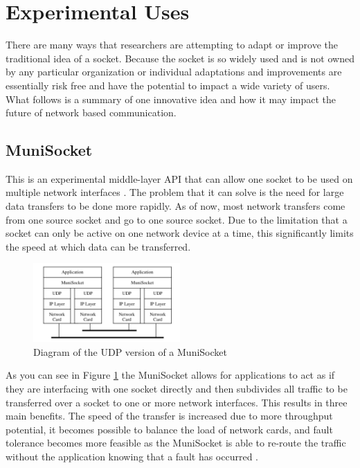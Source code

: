 \documentclass[conference, 12pt]{IEEEtran}
\begin{document}
\section{Experimental Uses}
There are many ways that researchers are attempting to adapt or improve the traditional idea of a socket. Because the socket is so widely used and is not owned by any particular organization or individual adaptations and improvements are essentially risk free and have the potential to impact a wide variety of users. What follows is a summary of one innovative idea and how it may impact the future of network based communication.

\subsection{MuniSocket}
This is an experimental middle-layer API that can allow one socket to be used on multiple network interfaces \cite{mohamed2002user}. The problem that it can solve is the need for large data transfers to be done more rapidly. As of now, most network transfers come from one source socket and go to one source socket. Due to the limitation that a socket can only be active on one network device at a time, this significantly limits the speed at which data can be transferred.


\begin{figure}[htbp]
    \centering
    \centerline{\includegraphics[width=0.5\textwidth]{Figure4.png}}
    \caption{Diagram of the UDP version of a MuniSocket \cite{mohamed2002user}}
    \label{Figure4}
\end{figure}

As you can see in Figure \ref{Figure4} the MuniSocket allows for applications to act as if they are interfacing with one socket directly and then subdivides all traffic to be transferred over a socket to one or more network interfaces. This results in three main benefits. The speed of the transfer is increased due to more throughput potential, it becomes possible to balance the load of network cards, and fault tolerance becomes more feasible as the MuniSocket is able to re-route the traffic without the application knowing that a fault has occurred \cite{mohamed2002user}.
\end{document}
